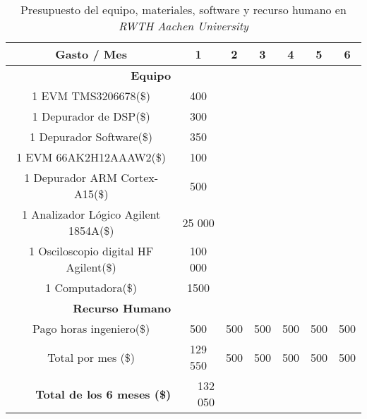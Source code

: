 \newpage

\begin{table}[ht]
\caption{Presupuesto del equipo, materiales, software y recurso humano en \textit{RWTH Aachen University}}
  \centering
  \begin{tabular}{| c | c | c | c | c | c | c |}
  \hline\hline
   Gasto / Mes 			& 1 & 2 & 3 & 4 & 5 & 6 			\\ \hline\hline
   \multicolumn{1}{|r}{\textbf{Equipo}} & \multicolumn{1}{r}{} & \multicolumn{1}{r}{} & \multicolumn{1}{r}{} & \multicolumn{1}{r}{} & \multicolumn{1}{r}{} & \multicolumn{1}{r|}{} \\ \hline
   1 EVM TMS3206678(\$)		& 400 & \multicolumn{1}{r}{} & \multicolumn{1}{r}{} & \multicolumn{1}{r}{} & \multicolumn{1}{r}{} & \multicolumn{1}{r|}{} \\ \hline 
   1 Depurador de DSP(\$)	& 300 & \multicolumn{1}{r}{} & \multicolumn{1}{r}{} & \multicolumn{1}{r}{} & \multicolumn{1}{r}{} & \multicolumn{1}{r|}{} \\ \hline
   1 Depurador Software(\$)	& 350 & \multicolumn{1}{r}{} & \multicolumn{1}{r}{} & \multicolumn{1}{r}{} & \multicolumn{1}{r}{} & \multicolumn{1}{r|}{} \\ \hline
   1 EVM 66AK2H12AAAW2(\$)	& 100 & \multicolumn{1}{r}{} & \multicolumn{1}{r}{} & \multicolumn{1}{r}{} & \multicolumn{1}{r}{} & \multicolumn{1}{r|}{} \\ \hline
   1 Depurador ARM Cortex-A15(\$) & 500 & \multicolumn{1}{r}{} & \multicolumn{1}{r}{} & \multicolumn{1}{r}{} & \multicolumn{1}{r}{} & \multicolumn{1}{r|}{} \\ \hline
   1 Analizador Lógico Agilent 1854A(\$) & 25 000 & \multicolumn{1}{r}{} & \multicolumn{1}{r}{} & \multicolumn{1}{r}{} & \multicolumn{1}{r}{} & \multicolumn{1}{r|}{} \\ \hline
   1 Osciloscopio digital HF Agilent(\$) & 100 000 & \multicolumn{1}{r}{} & \multicolumn{1}{r}{} & \multicolumn{1}{r}{} & \multicolumn{1}{r}{} & \multicolumn{1}{r|}{} \\ \hline
   1 Computadora(\$)		& 1500 & \multicolumn{1}{r}{} & \multicolumn{1}{r}{} & \multicolumn{1}{r}{} & \multicolumn{1}{r}{} & \multicolumn{1}{r|}{} \\ \hline
   \multicolumn{1}{|r}{\textbf{Recurso Humano}} & \multicolumn{1}{r}{} & \multicolumn{1}{r}{} & \multicolumn{1}{r}{} & \multicolumn{1}{r}{} & \multicolumn{1}{r}{} & \multicolumn{1}{r|}{} \\ \hline
   Pago horas ingeniero(\$)    & 500 & 500 & 500 & 500 & 500 & \multicolumn{1}{r|}{500} \\ \hline
   Total por mes (\$)		& 129 550 & 500 & 500 & 500 & 500 & \multicolumn{1}{r|}{500} \\ \hline
   \multicolumn{1}{|r}{\textbf{Total de los 6 meses (\$)}} & \multicolumn{1}{|r}{132 050} & \multicolumn{1}{r}{} & \multicolumn{1}{r}{} & \multicolumn{1}{r}{} & \multicolumn{1}{r}{} & \multicolumn{1}{r|}{} \\ \hline\hline
   
  \end{tabular}
  \label{tab:Presupuesto del equipo, materiales, software y recurso humano en RWTH Aachen University}
 
 
\end{table}

